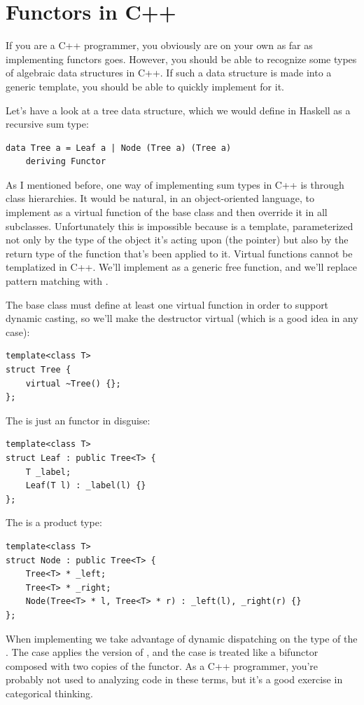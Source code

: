 \section{Functors in C++}

If you are a C++ programmer, you obviously are on your own as far as
implementing functors goes. However, you should be able to recognize
some types of algebraic data structures in C++. If such a data structure
is made into a generic template, you should be able to quickly implement
 for it.

Let's have a look at a tree data structure, which we would define in
Haskell as a recursive sum type:

\begin{Verbatim}
data Tree a = Leaf a | Node (Tree a) (Tree a)
    deriving Functor
\end{Verbatim}
As I mentioned before, one way of implementing sum types in C++ is
through class hierarchies. It would be natural, in an object-oriented
language, to implement  as a virtual function of the base
class  and then override it in all subclasses.
Unfortunately this is impossible because  is a template,
parameterized not only by the type of the object it's acting upon (the
 pointer) but also by the return type of the function
that's been applied to it. Virtual functions cannot be templatized in
C++. We'll implement  as a generic free function, and we'll
replace pattern matching with .

The base class must define at least one virtual function in order to
support dynamic casting, so we'll make the destructor virtual (which is
a good idea in any case):

\begin{Verbatim}
template<class T>
struct Tree { 
    virtual ~Tree() {};
};
\end{Verbatim}
The  is just an  functor in disguise:

\begin{Verbatim}
template<class T>
struct Leaf : public Tree<T> {
    T _label;
    Leaf(T l) : _label(l) {}
};
\end{Verbatim}
The  is a product type:

\begin{Verbatim}
template<class T>
struct Node : public Tree<T> {
    Tree<T> * _left;
    Tree<T> * _right;
    Node(Tree<T> * l, Tree<T> * r) : _left(l), _right(r) {}
};
\end{Verbatim}
When implementing  we take advantage of dynamic dispatching
on the type of the . The  case applies the
 version of , and the  case
is treated like a bifunctor composed with two copies of the
 functor. As a C++ programmer, you're probably not used to
analyzing code in these terms, but it's a good exercise in categorical
thinking.


